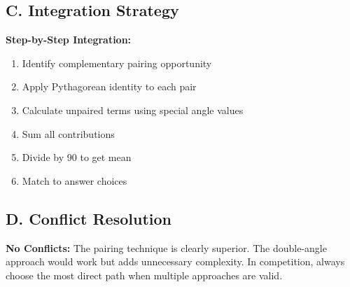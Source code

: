 \documentclass[12pt]{article}
\begin{document}
\begin{techniquesbox}
\subsection*{C. Integration Strategy}

\textbf{Step-by-Step Integration:}
\begin{enumerate}
    \item Identify complementary pairing opportunity
    \item Apply Pythagorean identity to each pair
    \item Calculate unpaired terms using special angle values
    \item Sum all contributions
    \item Divide by 90 to get mean
    \item Match to answer choices
\end{enumerate}

\subsection*{D. Conflict Resolution}

\textbf{No Conflicts:} The pairing technique is clearly superior. The double-angle approach would work but adds unnecessary complexity. In competition, always choose the most direct path when multiple approaches are valid.
\end{techniquesbox}

\vspace{1em}
\end{document}
